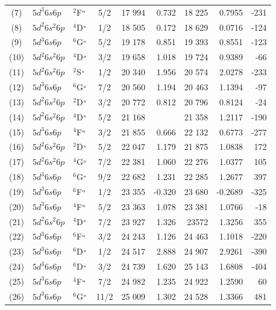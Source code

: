 \documentclass[10pt,a4paper, twoside]{report}
\begin{document}
\begin{table}[p!]
\begin{tabular}{cl@{\hspace{0.5cm}}l@{\hspace{0.5cm}}c@{\hspace{0.5cm}}r@{\hspace{0.5cm}}r@{\hspace{0.5cm}}r@{\hspace{0.5cm}}r@{\hspace{0.5cm}}r}
(7)  &$5d^3 6s 6p$ & $^2$F$^{\rm_o}$  & 5/2 & 17 994 & 0.732 &  18 225 &   0.7955  & -231\\
(8)  &$5d^2 6s^2 6p$ & $^4$D$^{\rm_o}$  & 1/2 & 18 505 & 0.172 & 18 629 &   0.0716  & -124\\
(9)  &$5d^3 6s 6p$ & $^6$G$^{\rm_o}$  & 5/2 & 19 178 & 0.851 & 19 393 &   0.8551 &  -123\\
(10)  &$5d^2 6s^2 6p$ & $^4$D$^{\rm_o}$  & 3/2 & 19 658 & 1.018 & 19 724 &   0.9389 & -66\\
(11)  &$5d^2 6s^2 6p$ & $^2$S$^{\rm_o}$  & 1/2 & 20 340 & 1.956 & 20 574 &   2.0278 & -233\\
(12)  &$5d^3 6s 6p$ & $^6$G$^{\rm_o}$  & 7/2 & 20 560 & 1.194 & 20 463 &   1.1394 & -97\\
(13)  &$5d^2 6s^2 6p$ & $^2$D$^{\rm_o}$  & 3/2 & 20 772 & 0.812 & 20 796 &     0.8124 & -24\\
(14)  &$5d^2 6s^2 6p$ & $^4$D$^{\rm_o}$  & 5/2 & 21 168 &   & 21 358 &   1.2117 &  -190\\
(15)  &$5d^3 6s 6p$ & $^4$F$^{\rm_o}$ & 3/2 & 21 855 & 0.666 & 22 132 & 0.6773 & -277 \\
(16)  &$5d^2 6s^2 6p$ & $^2$D$^{\rm_o}$ & 5/2 & 22 047 & 1.179 & 21 875 & 1.0838 & 172 \\
(17)  &$5d^2 6s^2 6p$ & $^4$G$^{\rm_o}$  & 7/2 & 22 381 & 1.060 & 22 276 & 1.0377 & 105 \\
(18)  &$5d^3 6s 6p$ & $^6$G$^{\rm_o}$ & 9/2 & 22 682 & 1.231 & 22 285 & 1.2677 & 397 \\
(19)  &$5d^3 6s 6p$ & $^6$F$^{\rm_o}$ & 1/2 & 23 355 & -0.320 & 23 680 & -0.2689 & -325 \\
(20)  &$5d^3 6s 6p$ & $^4$F$^{\rm_o}$ & 5/2 & 23 363 & 1.078 & 23 381 & 1.0766 & -18 \\
(21)  &$5d^2 6s^2 6p$ & $^4$D$^{\rm_o}$ & 7/2 & 23 927 & 1.326 & 23572 & 1.3256 & 355 \\
(22)  &$5d^3 6s 6p$ & $^6$F$^{\rm_o}$ & 3/2 & 24 243 & 1.126 & 24 463 & 1.1018 & -220 \\
(23)  &$5d^3 6s 6p$ & $^6$D$^{\rm_o}$ & 1/2 & 24 517 & 2.888 & 24 907 & 2.9261 & -390 \\
(24)  &$5d^3 6s 6p$ & $^6$D$^{\rm_o}$ & 3/2 & 24 739 & 1.620 & 25 143 & 1.6808& -404 \\
(25)  &$5d^3 6s 6p$ & $^4$F$^{\rm_o}$  & 7/2 & 24 982 & 1.235  & 24 922 & 1.2590 & 60 \\
(26)  &$5d^3 6s 6p$ & $^6$G$^{\rm_o}$ & 11/2 & 25 009 & 1.302 & 24 528 & 1.3366 & 481 \\

\end{tabular}
\end{table}
\end{document}
